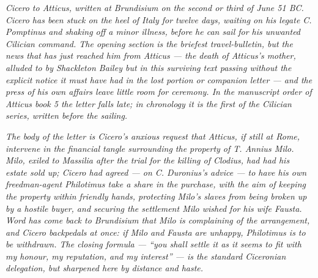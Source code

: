 
\textit{Cicero to Atticus, written at Brundisium on the second or
third of June 51 BC. Cicero has been stuck on the heel of Italy
for twelve days, waiting on his legate C. Pomptinus and shaking
off a minor illness, before he can sail for his unwanted
Cilician command. The opening section is the briefest
travel-bulletin, but the news that has just reached him from
Atticus --- the death of Atticus's mother, alluded to by
Shackleton Bailey but in this surviving text passing without
the explicit notice it must have had in the lost portion or
companion letter --- and the press of his own affairs leave
little room for ceremony. In the manuscript order of Atticus
book 5 the letter falls late; in chronology it is the first of
the Cilician series, written before the sailing.}

\textit{The body of the letter is Cicero's anxious request that
Atticus, if still at Rome, intervene in the financial tangle
surrounding the property of T. Annius Milo. Milo, exiled to
Massilia after the trial for the killing of Clodius, had had
his estate sold up; Cicero had agreed --- on C. Duronius's
advice --- to have his own freedman-agent Philotimus take a
share in the purchase, with the aim of keeping the property
within friendly hands, protecting Milo's slaves from being
broken up by a hostile buyer, and securing the settlement Milo
wished for his wife Fausta. Word has come back to Brundisium
that Milo is complaining of the arrangement, and Cicero
backpedals at once: if Milo and Fausta are unhappy, Philotimus
is to be withdrawn. The closing formula --- ``you shall settle
it as it seems to fit with my honour, my reputation, and my
interest'' --- is the standard Ciceronian delegation, but
sharpened here by distance and haste.}

